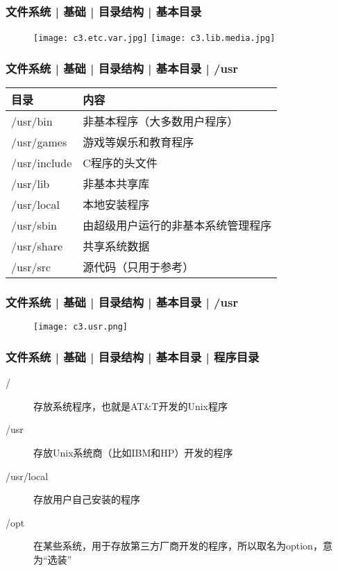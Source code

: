 \begin{frame}
  \frametitle{文件系统 | 基础 | 目录结构 | 基本目录}
  \begin{figure}
    \centering
    \texttt{[image: c3.etc.var.jpg]}
    \texttt{[image: c3.lib.media.jpg]}
  \end{figure}
\end{frame}

\begin{frame}
  \frametitle{文件系统 | 基础 | 目录结构 | 基本目录 | \alert{/usr}}
  \begin{table}
    \centering
    \begin{tabular}{ll}
      \hline
      \rowcolor{blue!50}目录 & 内容\\
      \hline
      \alert{/usr/bin} & 非基本程序（大多数用户程序）\\
      /usr/games & 游戏等娱乐和教育程序\\
      /usr/include & C程序的头文件\\
      /usr/lib & 非基本共享库\\
      \alert{/usr/local} & 本地安装程序\\
      /usr/sbin & 由超级用户运行的非基本系统管理程序\\
      /usr/share & 共享系统数据\\
      /usr/src & 源代码（只用于参考）\\
      \hline
    \end{tabular}
  \end{table}
\end{frame}

\begin{frame}
  \frametitle{文件系统 | 基础 | 目录结构 | 基本目录 | /usr}
  \begin{figure}
    \centering
    \texttt{[image: c3.usr.png]}
  \end{figure}
\end{frame}

\begin{frame}
  \frametitle{文件系统 | 基础 | 目录结构 | 基本目录 | 程序目录}
  \begin{description}
    \item[/] 存放系统程序，也就是AT\&T开发的Unix程序
    \item[/usr] 存放Unix系统商（比如IBM和HP）开发的程序
    \item[/usr/local] 存放用户自己安装的程序
    \item[/opt] 在某些系统，用于存放第三方厂商开发的程序，所以取名为option，意为“选装”
  \end{description}
\end{frame}

